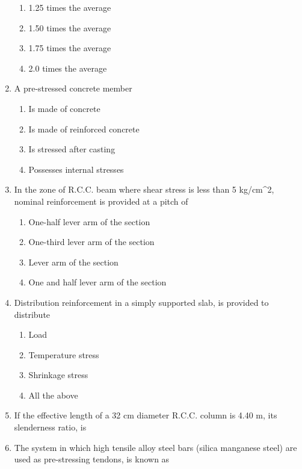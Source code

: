 \documentclass[11pt,a4paper]{article}
\begin{document}
\begin{enumerate}
\begin{enumerate}[label=\Alph*.]
\item{1.25 times the average}
\item{1.50 times the average}
\item{1.75 times the average}
\item{2.0 times the average}
\end{enumerate}
\item{A pre-stressed concrete member}
\begin{enumerate}[label=\Alph*.]
\item{Is made of concrete}
\item{Is made of reinforced concrete}
\item{Is stressed after casting}
\item{Possesses internal stresses}
\end{enumerate}
\item{In the zone of R.C.C. beam where shear stress is less than 5 kg/cm\^{}2, nominal reinforcement is provided at a pitch of
}
\begin{enumerate}[label=\Alph*.]
\item{One-half lever arm of the section}
\item{One-third lever arm of the section}
\item{Lever arm of the section}
\item{One and half lever arm of the section}
\end{enumerate}
\item{Distribution reinforcement in a simply supported slab, is provided to distribute}
\begin{enumerate}[label=\Alph*.]
\item{Load}
\item{Temperature stress}
\item{Shrinkage stress}
\item{All the above}
\end{enumerate}
\item{If the effective length of a 32 cm diameter R.C.C. column is 4.40 m, its slenderness ratio, is}
\\
\item{The system in which high tensile alloy steel bars (silica manganese steel) are used as pre-stressing tendons, is known as}

\end{enumerate}
\end{document}
